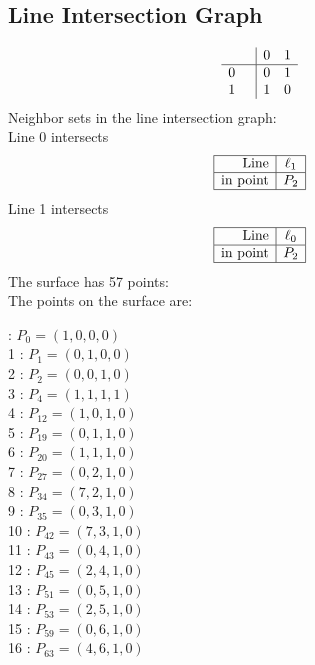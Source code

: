 \documentclass{article}
\begin{document}
{\subsection*{Line Intersection Graph}
{\arraycolsep=1pt
$$
\begin{array}{rr|*{2}r}
 &  & 0 & 1\\
\hline
0 &  & 0 & 1\\
1 &  & 1 & 0\\
\end{array}
$$
}%
Neighbor sets in the line intersection graph:\\
Line 0 intersects 
$$
\begin{array}{|r*{1}{|c}|}
\hline
\mbox{Line}  & \ell_{1}\\
\hline
\mbox{in point}  & P_{2}\\
\hline
\end{array}
$$
Line 1 intersects 
$$
\begin{array}{|r*{1}{|c}|}
\hline
\mbox{Line}  & \ell_{0}\\
\hline
\mbox{in point}  & P_{2}\\
\hline
\end{array}
$$
The surface has 57 points:\\
The points on the surface are:\\
\begin{multicols}{3}
 : $P_{0}=( 1, 0, 0, 0 )$\\
1 : $P_{1}=( 0, 1, 0, 0 )$\\
2 : $P_{2}=( 0, 0, 1, 0 )$\\
3 : $P_{4}=( 1, 1, 1, 1 )$\\
4 : $P_{12}=( 1, 0, 1, 0 )$\\
5 : $P_{19}=( 0, 1, 1, 0 )$\\
6 : $P_{20}=( 1, 1, 1, 0 )$\\
7 : $P_{27}=( 0, 2, 1, 0 )$\\
8 : $P_{34}=( 7, 2, 1, 0 )$\\
9 : $P_{35}=( 0, 3, 1, 0 )$\\
10 : $P_{42}=( 7, 3, 1, 0 )$\\
11 : $P_{43}=( 0, 4, 1, 0 )$\\
12 : $P_{45}=( 2, 4, 1, 0 )$\\
13 : $P_{51}=( 0, 5, 1, 0 )$\\
14 : $P_{53}=( 2, 5, 1, 0 )$\\
15 : $P_{59}=( 0, 6, 1, 0 )$\\
16 : $P_{63}=( 4, 6, 1, 0 )$\\

\end{multicols}}
\end{document}
